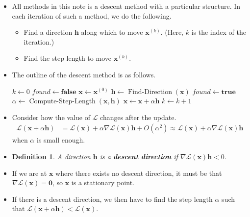 \documentclass[10pt]{article}
\newtheorem{definition}[lemma]{Definition}
\newcommand{\ve}[1]{\mathbf{#1}}
\newcommand{\mcal}[1]{\mathcal{#1}}
\begin{document}
\begin{itemize}
    \item All methods in this note is a descent method with a particular structure. In each iteration of such a method, we do the following.
    \begin{itemize}
        \item Find a direction $\ve{h}$ along which to move $\ve{x}^{(k)}$. (Here, $k$ is the index of the iteration.)
        \item Find the step length to move $\ve{x}^{(k)}$.
    \end{itemize}
    
    \item The outline of the descent method is as follows.
    \medskip
    \begin{algorithmic}
        \State $k \gets 0$
        \State $found \gets \mathbf{false}$
        \State $\ve{x} \gets \ve{x}^{(0)}$
            \State $\ve{h} \gets \operatorname{Find-Direction}(\ve{x})$
            \If {(no such $\ve{h}$ exists)}
                \State $found \gets \mathbf{true}$
            \Else
                \State $\alpha \gets \operatorname{Compute-Step-Length}(\ve{x}, \ve{h})$
                \State $\ve{x} \gets \ve{x} + \alpha\ve{h}$
                \State $k \gets k+1$
            \EndIf
        \EndWhile
    \end{algorithmic}

    \item Consider how the value of $\mcal{L}$ changes after the update.
    \begin{align*}
        \mcal{L}(\ve{x} + \alpha \ve{h}) 
        &= \mcal{L}(\ve{x}) + \alpha \nabla \mcal{L}(\ve{x}) \ve{h} + O(\alpha^2) 
        \approx \mcal{L}(\ve{x}) + \alpha \nabla \mcal{L}(\ve{x}) \ve{h}
    \end{align*}
    when $\alpha$ is small enough. 
    
    \item \begin{definition}
        A direction $\ve{h}$ is a {\bf descent direction} if $\nabla \mcal{L}(\ve{x}) \ve{h} < 0$.
    \end{definition}

    \item If we are at $\ve{x}$ where there exists no descent direction, it must be that $\nabla \mcal{L}(\ve{x}) = \ve{0}$, so $\ve{x}$ is a stationary point.
    
    \item If there is a descent direction, we then have to find the step length $\alpha$ such that $\mcal{L}(\ve{x} + \alpha \ve{h}) < \mcal{L}(\ve{x}).$ 
\end{itemize}
\end{document}
